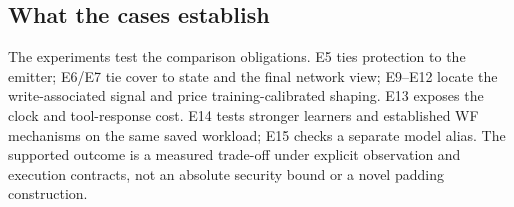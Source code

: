 \subsection{What the cases establish}
The experiments test the comparison obligations. E5 ties protection to the emitter; E6/E7 tie cover to state and the final network view; E9--E12 locate the write-associated signal and price training-calibrated shaping. E13 exposes the clock and tool-response cost. E14 tests stronger learners and established WF mechanisms on the same saved workload; E15 checks a separate model alias. The supported outcome is a measured trade-off under explicit observation and execution contracts, not an absolute security bound or a novel padding construction.

